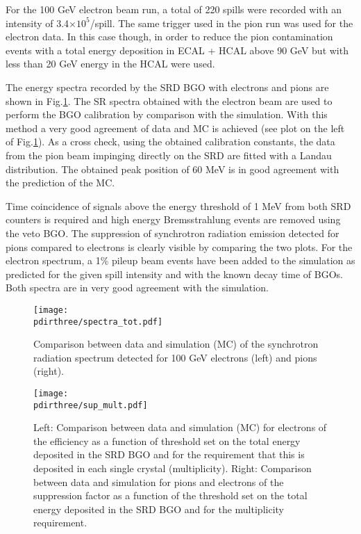 For the 100 GeV electron beam run, a total of 220 spills were recorded with an intensity of 3.4$\times 10^5$/spill. 
The same trigger used in the pion run was used for the electron data.
In this case though, in order to reduce the pion contamination events with a total energy deposition in ECAL + HCAL above 90 GeV but with less than 20 GeV energy in the HCAL were used.  


The energy spectra recorded by the SRD BGO with electrons and pions are shown in Fig.\ref{fig:comp_spectra}. The SR spectra obtained with the electron beam are used to perform the BGO calibration by comparison with the simulation. With this method a very good agreement of data and MC is achieved (see plot on the left of Fig.\ref{fig:comp_spectra}). As a cross check, using the obtained calibration constants, the data from the pion beam impinging directly on the SRD are fitted with a Landau distribution. The obtained peak position of 60 MeV is in good agreement with the prediction of the MC. 

Time coincidence of signals above the energy threshold of 1 MeV from both SRD counters is required and high energy Bremsstrahlung events are removed using the veto BGO.
The suppression of synchrotron radiation emission detected for pions compared to electrons is clearly visible by comparing the two plots. For the electron spectrum, a 1\% pileup beam events have been added to the simulation as predicted for the given spill intensity and with the known decay time of BGOs.  Both spectra are in very good agreement with the simulation.

\begin{figure}[htb!]
  \centering
  \texttt{[image: \\pdirthree/spectra\_tot.pdf]}
  \caption[SRD comparison between data and MC]{Comparison between data and simulation (MC) of the synchrotron radiation spectrum detected for 100 GeV electrons (left) and pions (right). }
  \label{fig:comp_spectra}
\end{figure} 

\begin{figure}[htb!]
  \centering
  \texttt{[image: \\pdirthree/sup\_mult.pdf]}
  \caption[efficiency and rejection power of the SRD cut]{Left: Comparison between data and simulation (MC) for electrons of the efficiency as a function of threshold set on the total energy deposited in the SRD BGO and for the requirement that this is deposited in each single crystal (multiplicity). Right: Comparison between data and simulation for pions and electrons of the suppression factor as a function of the threshold set on the total energy deposited in the SRD BGO and for the multiplicity requirement.}
  \label{fig:sup_mult}
\end{figure}

